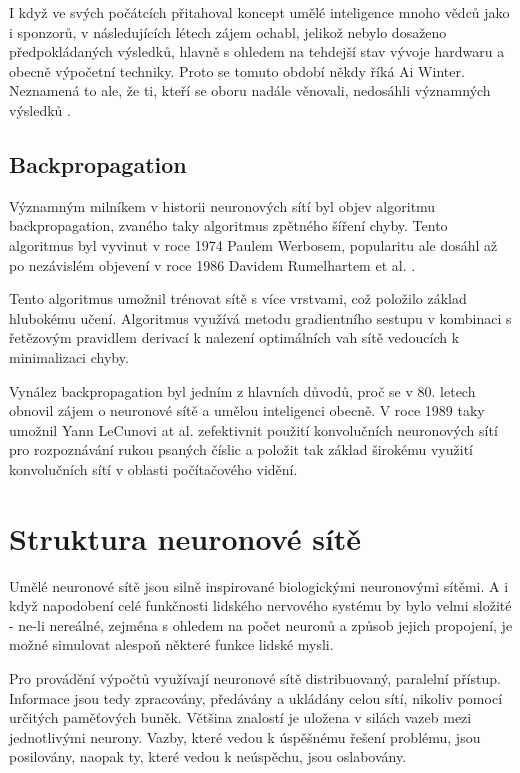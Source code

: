 I když ve svých počátcích přitahoval koncept umělé inteligence mnoho vědců jako
i sponzorů, v následujících létech zájem ochabl, jelikož nebylo dosaženo
předpokládaných výsledků, hlavně s ohledem na tehdejší stav vývoje hardwaru a
obecně výpočetní techniky. Proto se tomuto období někdy říká Ai Winter.
Neznamená to ale, že ti, kteří se oboru nadále věnovali, nedosáhli významných
výsledků \cite{nn_history}.

\subsection{Backpropagation}
Významným milníkem v historii neuronových sítí byl objev algoritmu
backpropagation, zvaného taky algoritmus zpětného šíření chyby. Tento
algoritmus byl vyvinut v roce 1974 Paulem Werbosem, popularitu ale dosáhl až po
nezávislém objevení v roce 1986 Davidem Rumelhartem et al.
\cite{backpropagation}.

Tento algoritmus umožnil trénovat sítě s více vrstvami, což položilo základ
hlubokému učení. Algoritmus využívá metodu gradientního sestupu v kombinaci s
řetězovým pravidlem derivací k nalezení optimálních vah sítě vedoucích k
minimalizaci chyby.

Vynález backpropagation byl jedním z hlavních důvodů, proč se v 80. letech
obnovil zájem o neuronové sítě a umělou inteligenci obecně. V roce 1989 taky
umožnil Yann LeCunovi at al. zefektivnit použití konvolučních neuronových sítí
pro rozpoznávání rukou psaných číslic \cite{lecun1989} a položit tak základ
širokému využití konvolučních sítí v oblasti počítačového vidění.

\section{Struktura neuronové sítě}

Umělé neuronové sítě jsou silně inspirované biologickými neuronovými sítěmi. A
i když napodobení celé funkčnosti lidského nervového systému by bylo velmi
složité - ne-li nereálné, zejména s ohledem na počet neuronů a způsob jejich
propojení, je možné simulovat alespoň některé funkce lidské mysli.

Pro provádění výpočtů využívají neuronové sítě distribuovaný, paralelní
přístup. Informace jsou tedy zpracovány, předávány a ukládány celou sítí,
nikoliv pomocí určitých paměťových buněk. Většina znalostí je uložena v silách
vazeb mezi jednotlivými neurony. Vazby, které vedou k úspěšnému řešení
problému, jsou posilovány, naopak ty, které vedou k neúspěchu, jsou oslabovány.

